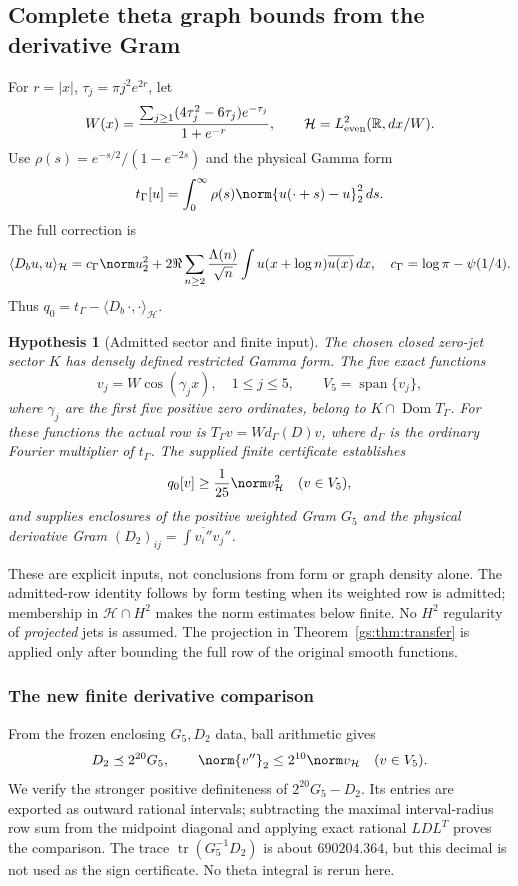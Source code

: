 \documentclass[11pt,a4paper]{article}
\numberwithin{equation}{section}
\newtheorem{hypothesis}[theorem]{Hypothesis}
\theoremstyle{definition}\newtheorem{definition}[theorem]{Definition}
\theoremstyle{remark}\newtheorem{remark}[theorem]{Remark}
\newcommand{\Hh}{\mathcal H}\newcommand{\Hw}{\mathcal H}
\begin{document}
\subsection{Complete theta graph bounds from the derivative Gram}
For $r=|x|$, $\tau_j=\pi j^2e^{2r}$, let
\[
 W(x)=\frac{\sum_{j\ge1}(4\tau_j^2-6\tau_j)e^{-\tau_j}}{1+e^{-r}},
 \qquad\Hh=L^2_{\rm even}(\mathbb R,dx/W).
\]
Use $\rho(s)=e^{-s/2}/(1-e^{-2s})$ and the physical Gamma form
\[
 t_\Gamma[u]=\int_0^\infty\rho(s)\norm{u(\cdot+s)-u}_2^2\,ds.
\]
The full correction is
\[
 \langle D_bu,u\rangle_\Hh=c_\Gamma\norm u_2^2+
 2\Re\sum_{n\ge2}\frac{\Lambda(n)}{\sqrt n}
 \int u(x+\log n)\overline{u(x)}\,dx,
 \quad c_\Gamma=\log\pi-\psi(1/4).
\]
Thus $q_0=t_\Gamma-\langle D_b\,\cdot,\cdot\rangle_\Hh$.

\begin{hypothesis}[Admitted sector and finite input]\label{gs:hyp:inputs}
The chosen closed zero-jet sector $K$ has densely defined restricted
Gamma form. The five exact functions
\[
 v_j=W\cos(\gamma_jx),\quad 1\le j\le5,\qquad V_5=\operatorname{span}\{v_j\},
\]
where $\gamma_j$ are the first five positive zero ordinates, belong to
$K\cap\operatorname{Dom}T_\Gamma$. For these functions the actual row is
$T_\Gamma v=W d_\Gamma(D)v$, where $d_\Gamma$ is the ordinary Fourier
multiplier of $t_\Gamma$. The supplied finite certificate establishes
\[
 q_0[v]\ge\frac1{25}\norm v_\Hh^2\quad(v\in V_5),
\]
and supplies enclosures of the positive weighted Gram $G_5$ and the
physical derivative Gram $(D_2)_{ij}=\int\overline{v_i''}v_j''$.
\end{hypothesis}

These are explicit inputs, not conclusions from form or graph density
alone. The admitted-row identity follows by form testing when its
weighted row is admitted; membership in $\Hh\cap H^2$ makes the norm
estimates below finite. No $H^2$ regularity of \emph{projected} jets is
assumed. The projection in Theorem~\ref{gs:thm:transfer} is applied only after
bounding the full row of the original smooth functions.

\subsubsection*{The new finite derivative comparison}
From the frozen enclosing $G_5,D_2$ data, ball arithmetic gives
\begin{equation}\label{gs:eq:D2}
 D_2\preceq2^{20}G_5,\qquad
 \norm{v''}_2\le2^{10}\norm v_\Hh\quad(v\in V_5).
\end{equation}
We verify the stronger positive definiteness of $2^{20}G_5-D_2$.
Its entries are exported as outward rational intervals; subtracting the
maximal interval-radius row sum from the midpoint diagonal and applying
exact rational $LDL^T$ proves the comparison. The trace
$\operatorname{tr}(G_5^{-1}D_2)$ is about $690204.364$, but this decimal
is not used as the sign certificate. No theta integral is rerun here.
\end{document}
